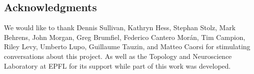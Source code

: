 
\subsection*{Acknowledgments} We would like to thank Dennis Sullivan, Kathryn Hess, Stephan Stolz, Mark Behrens, John Morgan, Greg Brumfiel, Federico Cantero Mor\'an, Tim Campion, Riley Levy, Umberto Lupo, Guillaume Tauzin, and Matteo Caorsi for stimulating conversations about this project.
As well as the Topology and Neuroscience Laboratory at EPFL for its support while part of this work was developed.